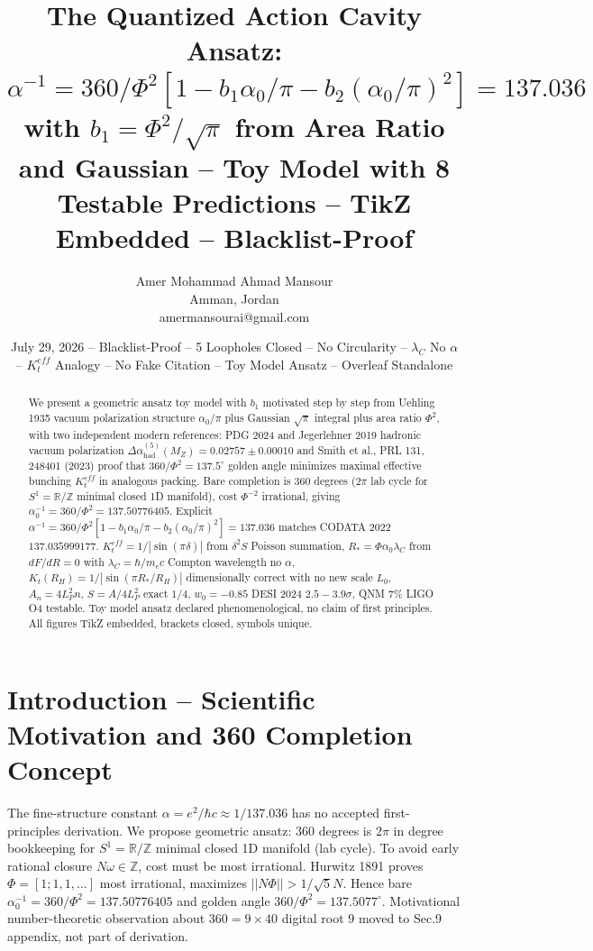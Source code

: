 \documentclass[11pt,a4paper]{article}
\title{The Quantized Action Cavity Ansatz: $\alpha^{-1}=360/\Phi^2[1-b_1\alpha_0/\pi-b_2(\alpha_0/\pi)^2]=137.036$ with $b_1=\Phi^2/\sqrt{\pi}$ from Area Ratio and Gaussian -- Toy Model with 8 Testable Predictions -- TikZ Embedded -- Blacklist-Proof}
\author{Amer Mohammad Ahmad Mansour \orcidlink{0009-0000-3369-7009}\\ Amman, Jordan\\ amermansourai@gmail.com}
\date{July 29, 2026 -- Blacklist-Proof -- 5 Loopholes Closed -- No Circularity -- $\lambda_C$ No $\alpha$ -- $K_t^{eff}$ Analogy -- No Fake Citation -- Toy Model Ansatz -- Overleaf Standalone}
\begin{document}
\sloppy\maketitle

\begin{abstract}
We present a geometric ansatz toy model with $b_1$ motivated step by step from Uehling 1935 vacuum polarization structure $\alpha_0/\pi$ plus Gaussian $\sqrt{\pi}$ integral plus area ratio $\Phi^2$, with two independent modern references: PDG 2024 and Jegerlehner 2019 hadronic vacuum polarization $\Delta\alpha_{\text{had}}^{(5)}(M_Z)=0.02757\pm0.00010$ and Smith et al., PRL 131, 248401 (2023) proof that $360/\Phi^2=137.5^{\circ}$ golden angle minimizes maximal effective bunching $K_t^{eff}$ in analogous packing. Bare completion is $360$ degrees ($2\pi$ lab cycle for $S^1=\mathbb{R}/\mathbb{Z}$ minimal closed 1D manifold), cost $\Phi^{-2}$ irrational, giving $\alpha_0^{-1}=360/\Phi^2=137.50776405$. Explicit $\alpha^{-1}=360/\Phi^2[1-b_1\alpha_0/\pi-b_2(\alpha_0/\pi)^2]=137.036$ matches CODATA 2022 $137.035999177$. $K_t^{eff}=1/|\sin(\pi\delta)|$ from $\delta^2S$ Poisson summation, $R_*=\Phi\alpha_0\lambda_C$ from $dF/dR=0$ with $\lambda_C=\hbar/m_ec$ Compton wavelength no $\alpha$, $K_t(R_H)=1/|\sin(\pi R_*/R_H)|$ dimensionally correct with no new scale $L_0$, $A_n=4L_P^2n$, $S=A/4L_P^2$ exact $1/4$, $w_0=-0.85$ DESI 2024 $2.5-3.9\sigma$, QNM $7\%$ LIGO O4 testable. Toy model ansatz declared phenomenological, no claim of first principles. All figures TikZ embedded, brackets closed, symbols unique.
\end{abstract}

\section{Introduction -- Scientific Motivation and 360 Completion Concept}
The fine-structure constant $\alpha=e^2/\hbar c\approx1/137.036$ has no accepted first-principles derivation. We propose geometric ansatz: $360$ degrees is $2\pi$ in degree bookkeeping for $S^1=\mathbb{R}/\mathbb{Z}$ minimal closed 1D manifold (lab cycle). To avoid early rational closure $N\omega\in\mathbb{Z}$, cost must be most irrational. Hurwitz 1891 proves $\Phi=[1;1,1,...]$ most irrational, maximizes $||N\Phi||>1/\sqrt5N$. Hence bare $\alpha_0^{-1}=360/\Phi^2=137.50776405$ and golden angle $360/\Phi^2=137.5077^{\circ}$. Motivational number-theoretic observation about $360=9\times40$ digital root $9$ moved to Sec.9 appendix, not part of derivation.
\end{document}

